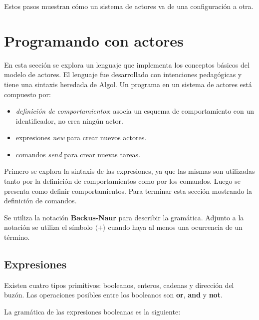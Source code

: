 Estos pasos muestran cómo un sistema de actores va de una configuración a otra. 

\section{Programando con actores}\label{actores:sal}
En esta sección se explora un lenguaje que implementa los conceptos básicos del modelo de actores. El lenguaje \SAL fue desarrollado con intenciones pedagógicas y tiene una sintaxis heredada de Algol. Un programa \SAL en un sistema de actores está compuesto por:

\begin{itemize}
 \item \textit{definición de comportamientos}: asocia un esquema de comportamiento con un identificador, no crea ningún actor.
 \item expresiones \textit{new} para crear nuevos actores.
 \item comandos \textit{send} para crear nuevas tareas.
\end{itemize}

Primero se explora la sintaxis de las expresiones, ya que las mismas son utilizadas tanto por la definición de comportamientos como por los comandos. Luego se presenta como definir comportamientos. Para terminar esta sección mostrando la definición de comandos.


Se utiliza la notación \textbf{Backus-Naur}\cite{McCracken:2003:BF:1074100.1074155} para describir la gramática. Adjunto a la notación se utiliza el símbolo $\langle \textbf{+} \rangle$ cuando haya al menos una ocurrencia de un término.

\subsection{Expresiones}\label{actores:exp}
Existen cuatro tipos primitivos: booleanos, enteros, cadenas y dirección del buzón. Las operaciones posibles entre los booleanos son \textbf{or}, \textbf{and} y \textbf{not}.

La gramática de las expresiones booleanas es la siguiente:

